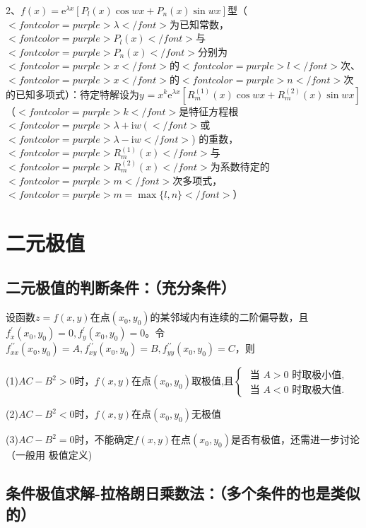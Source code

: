 2、$ f(x)=\mathrm{e}^{\lambda x}\left[P_{l}(x) \cos w x+P_{n}(x) \sin w x\right] $型（$ <font color=purple>\lambda</font> $为已知常数，$ <font color=purple>P_{l}(x)</font> $与$ <font color=purple>P_{n}(x)</font> $分别为$ <font color=purple>x</font> $的$ <font color=purple>l</font> $次、$ <font color=purple>x</font> $的$ <font color=purple>n</font> $次的已知多项式）：待定特解设为$ y^{}=x^{k} \mathrm{e}^{\lambda x}\left[R_{m}^{(1)}(x) \cos w x+R_{m}^{(2)}(x) \sin w x\right] $（$ <font color=purple>k</font> $是特征方程根$ <font color=purple>\lambda+\mathrm{i} w\left(\right.</font> $或$ <font color=purple>\lambda-\mathrm{i} w</font> $) 的重数，$ <font color=purple>R_{m}^{(1)}(x)</font> $与$ <font color=purple>R_{m}^{(2)}(x)</font> $为系数待定的$ <font color=purple>m</font> $次多项式，$ <font color=purple>m=\max \{l, n\}</font> $）

\section{二元极值}



\subsection{二元极值的判断条件：（充分条件）}

设函数$ z=f(x, y) $在点$ \left(x_{0}, y_{0}\right) $的某邻域内有连续的二阶偏导数，且$ f_{x}^{\prime}\left(x_{0}, y_{0}\right)=0, f_{y}^{\prime}\left(x_{0}, y_{0}\right)=0 $。令$ f_{x x}^{\prime \prime}\left(x_{0}, y_{0}\right)=A, f_{x y}^{\prime \prime}\left(x_{0}, y_{0}\right)=B, f_{y y}^{\prime \prime}\left(x_{0}, y_{0}\right)=C $，则

(1)$ A C-B^{2}>0 $时，$ f(x, y) $在点$ \left(x_{0}, y_{0}\right) $取极值,且$ \left\{\begin{array}{l}\text { 当 } A>0 \text { 时取极小值, } \\ \text { 当 } A<0 \text { 时取极大值. }\end{array}\right. $

(2)$ A C-B^{2}<0 $时，$ f(x, y) $在点$ \left(x_{0}, y_{0}\right) $无极值

(3)$ A C-B^{2}=0 $时，不能确定$ f(x, y) $在点$ \left(x_{0}, y_{0}\right) $是否有极值，还需进一步讨论（一般用 极值定义)



\subsection{条件极值求解-拉格朗日乘数法：（多个条件的也是类似的）}

